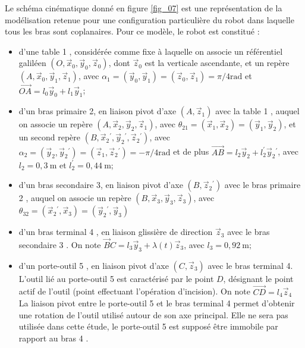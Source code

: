 Le schéma cinématique donné en figure \ref{fig_07} est une représentation de la modélisation retenue pour une configuration particulière du robot dans laquelle tous les bras sont coplanaires. Pour ce modèle, le robot est constitué :

\begin{itemize}
  \item d'une table 1 , considérée comme fixe à laquelle on associe un référentiel galiléen $\left(O, \vec{x}_{0}, \vec{y}_{0}, \vec{z}_{0}\right)$, dont $\vec{z}_{0}$ est la verticale ascendante, et un repère $\left(A, \vec{x}_{0}, \vec{y}_{1}, \vec{z}_{1}\right)$, avec $\alpha_{1}=\left(\vec{y}_{0}, \vec{y}_{1}\right)=\left(\vec{z}_{0}, \vec{z}_{1}\right)=\pi / 4 \mathrm{rad}$ et $\overrightarrow{O A}=l_{0} \vec{y}_{0}+l_{1} \vec{y}_{1}$;
  \item d'un bras primaire 2, en liaison pivot d'axe $\left(A, \vec{z}_{1}\right)$ avec la table 1 , auquel on associe un repère $\left(A, \vec{x}_{2}, \vec{y}_{2}, \vec{z}_{1}\right)$, avec $\theta_{21}=\left(\vec{x}_{1}, \vec{x}_{2}\right)=\left(\vec{y}_{1}, \vec{y}_{2}\right)$, et un second repère $\left(B, \vec{x}_{2}{ }^{\prime}, \vec{y}_{2}{ }^{\prime}, \vec{z}_{2}{ }^{\prime}\right)$, avec $\alpha_{2}=\left(\vec{y}_{2}, \vec{y}_{2}{ }^{\prime}\right)=\left(\vec{z}_{1}, \vec{z}_{2}{ }^{\prime}\right)=-\pi / 4 \mathrm{rad}$ et de plus $\overrightarrow{A B}=l_{2} \vec{y}_{2}+l_{2}^{\prime} \vec{y}_{2}{ }^{\prime}$, avec $l_{2}=0,3 \mathrm{~m}$ et $l_{2}^{\prime}=0,44 \mathrm{~m}$;
  \item d'un bras secondaire 3, en liaison pivot d'axe $\left(B, \vec{z}_{2}{ }^{\prime}\right)$ avec le bras primaire 2 , auquel on associe un repère $\left(B, \vec{x}_{3}, \vec{y}_{3}, \vec{z}_{3}\right)$, avec $\theta_{32}=\left(\vec{x}_{2}{ }^{\prime}, \vec{x}_{3}\right)=\left(\vec{y}_{2}{ }^{\prime}, \vec{y}_{3}\right)$
  \item d'un bras terminal 4 , en liaison glissière de direction $\vec{z}_{3}$ avec le bras secondaire 3 . On note $\vec{B} C=l_{3} \vec{y}_{3}+\lambda(t) \vec{z}_{3}$, avec $l_{3}=0,92 \mathrm{~m} ;$
  \item d'un porte-outil 5 , en liaison pivot d'axe $\left(C, \vec{z}_{3}\right)$ avec le bras terminal 4. L'outil lié au porte-outil 5 est caractérisé par le point $D$, désignant le point actif de l'outil (point effectuant l'opération d'incision). On note $\overrightarrow{C D}=l_{4} \vec{z}_{4}$\\
La liaison pivot entre le porte-outil 5 et le bras terminal 4 permet d'obtenir une rotation de l'outil utilisé autour de son axe principal. Elle ne sera pas utilisée dans cette étude, le porte-outil 5 est supposé être immobile par rapport au bras 4 .\\

\end{itemize}
